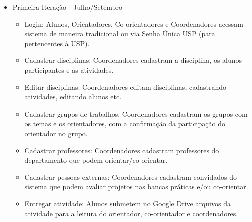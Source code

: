 \begin{itemize}
    \item Primeira Iteração - Julho/Setembro
    \begin{itemize}
        \item Login: Alunos, Orientadores, Co-orientadores e Coordenadores acessam sistema de maneira tradicional ou via Senha Única USP (para pertencentes à USP).
        \item Cadastrar disciplinas: Coordenadores cadastram a disciplina, os alunos participantes e as atividades.
        \item Editar disciplinas: Coordenadores editam disciplinas, cadastrando atividades, editando alunos etc.
        \item Cadastrar grupos de trabalhos: Coordenadores cadastram os grupos com os temas e os orientadores, com a confirmação da participação do orientador no grupo.
        \item Cadastrar professores: Coordenadores cadastram professores do departamento que podem orientar/co-orientar.
        \item Cadastrar pessoas externas: Coordenadores cadastram convidados do sistema que podem avaliar projetos nas bancas práticas e/ou co-orientar.
        \item Entregar atividade: Alunos submetem no Google Drive arquivos da atividade para a leitura do orientador, co-orientador e coordenadores.
    \end{itemize}
\end{itemize}

